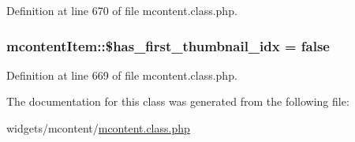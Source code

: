 Definition at line 670 of file mcontent.\-class.\-php.

\hypertarget{classmcontentItem_a8c95afa6c7bcad64626c9f343e77cdd4}{
\subsubsection[{\$has\-\_\-first\-\_\-thumbnail\-\_\-idx}]{\setlength{\rightskip}{0pt plus 5cm}mcontent\-Item\-::\$has\-\_\-first\-\_\-thumbnail\-\_\-idx = false}}\label{classmcontentItem_a8c95afa6c7bcad64626c9f343e77cdd4}


Definition at line 669 of file mcontent.\-class.\-php.



The documentation for this class was generated from the following file\-:\begin{DoxyCompactItemize}
\item 
widgets/mcontent/\hyperlink{mcontent_8class_8php}{mcontent.\-class.\-php}\end{DoxyCompactItemize}
